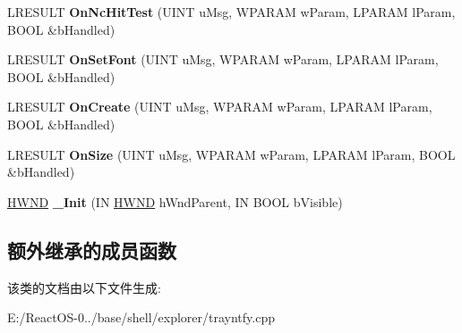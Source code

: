 \begin{DoxyCompactItemize}
L\+R\+E\+S\+U\+LT {\bfseries On\+Nc\+Hit\+Test} (U\+I\+NT u\+Msg, W\+P\+A\+R\+AM w\+Param, L\+P\+A\+R\+AM l\+Param, B\+O\+OL \&b\+Handled)
\item 
\mbox{\label{class_c_tray_clock_wnd_aa8b3fbbb4ab47251bc8bb87232386389}} 
L\+R\+E\+S\+U\+LT {\bfseries On\+Set\+Font} (U\+I\+NT u\+Msg, W\+P\+A\+R\+AM w\+Param, L\+P\+A\+R\+AM l\+Param, B\+O\+OL \&b\+Handled)
\item 
\mbox{\label{class_c_tray_clock_wnd_ab3f00020809c469b84be5518b35d77b7}} 
L\+R\+E\+S\+U\+LT {\bfseries On\+Create} (U\+I\+NT u\+Msg, W\+P\+A\+R\+AM w\+Param, L\+P\+A\+R\+AM l\+Param, B\+O\+OL \&b\+Handled)
\item 
\mbox{\label{class_c_tray_clock_wnd_af0b727c9bafce6a3fa16bf563cfe9751}} 
L\+R\+E\+S\+U\+LT {\bfseries On\+Size} (U\+I\+NT u\+Msg, W\+P\+A\+R\+AM w\+Param, L\+P\+A\+R\+AM l\+Param, B\+O\+OL \&b\+Handled)
\item 
\mbox{\label{class_c_tray_clock_wnd_a1ef2ef211a69bf103632d359fcb0dd31}} 
\hyperlink{interfacevoid}{H\+W\+ND} {\bfseries \+\_\+\+Init} (IN \hyperlink{interfacevoid}{H\+W\+ND} h\+Wnd\+Parent, IN B\+O\+OL b\+Visible)
\end{DoxyCompactItemize}
\subsection*{额外继承的成员函数}


该类的文档由以下文件生成\+:\begin{DoxyCompactItemize}
\item 
E\+:/\+React\+O\+S-\/0../base/shell/explorer/trayntfy.\+cpp\end{DoxyCompactItemize}
